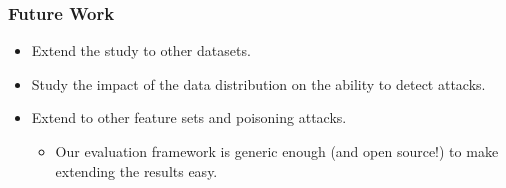 \documentclass[color,t,presentation,english,aspectratio=169]{beamer}
\begin{document}
\begin{frame}
	\frametitle{Future Work}
	\begin{itemize}
		\item Extend the study to other datasets. \only<2>{\textcolor{red}{[DONE!]}}
		\item Study the impact of the data distribution on the ability to detect attacks. \only<2>{\textcolor{red}{[DONE!]}}
		\item Extend to other feature sets and poisoning attacks.
		\begin{itemize}
			\item Our evaluation framework is generic enough (and open source!) to make extending the results easy.
		\end{itemize}
	\end{itemize}
	\vspace{3\baselineskip}
	\begin{center}
			
		\end{center}
	\end{frame}
	
	
\end{document}
